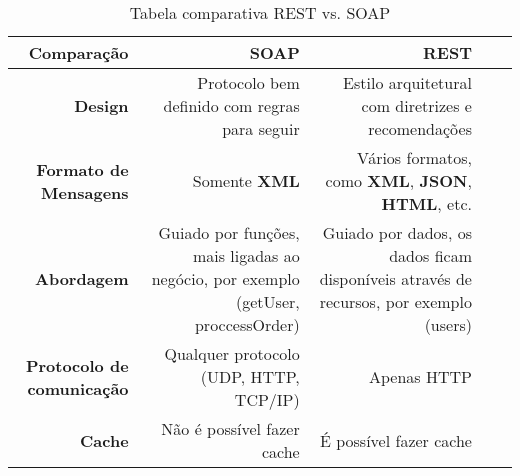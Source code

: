\begin{table}[!htb]
    \centering
    \caption[REST vs. SOAP]{Tabela comparativa REST vs. SOAP
    \label{tab:rest-vs-soap}}
    \begin{tabular}{rrrrr}
        \toprule
            Comparação & \textbf{SOAP} & \textbf{REST} \\
        \midrule
            \textbf{Design} & Protocolo bem definido com regras para seguir & Estilo arquitetural com diretrizes e recomendações\\
            \textbf{Formato de Mensagens} & Somente \textbf{XML} & Vários formatos, como \textbf{XML}, \textbf{JSON}, \textbf{HTML}, etc. \\
            \textbf{Abordagem} & Guiado por funções, mais ligadas ao negócio, por exemplo (getUser, proccessOrder) & Guiado por dados, os dados ficam disponíveis através de recursos, por exemplo (users) \\
            \textbf{Protocolo de comunicação} & Qualquer protocolo (UDP, HTTP, TCP/IP) & Apenas HTTP \\
            \textbf{Cache} & Não é possível fazer cache & É possível fazer cache \\
        \bottomrule
    \end{tabular}
\end{table}
